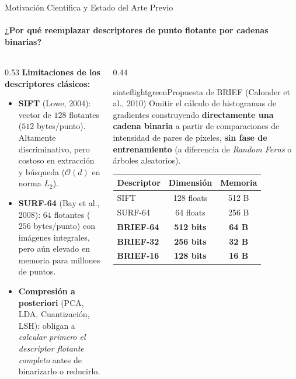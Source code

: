\documentclass{beamer}
\begin{document}
\begin{frame}{Motivación Científica y Estado del Arte Previo}
\framesubtitle{¿Por qué reemplazar descriptores de punto flotante por cadenas binarias?}
\begin{columns}[T]
\begin{column}{0.53\textwidth}
\scriptsize
\textbf{Limitaciones de los descriptores clásicos:}
\begin{itemize}\setlength{\itemsep}{4pt}
    \item \textbf{SIFT} (Lowe, 2004): vector de $128$ flotantes ($512$ bytes/punto). Altamente discriminativo, pero costoso en extracción y búsqueda ($\mathcal{O}(d)$ en norma $L_2$).
    \item \textbf{SURF-64} (Bay et al., 2008): $64$ flotantes ($256$ bytes/punto) con imágenes integrales, pero aún elevado en memoria para millones de puntos.
    \item \textbf{Compresión a posteriori} (PCA, LDA, Cuantización, LSH): obligan a \emph{calcular primero el descriptor flotante completo} antes de binarizarlo o reducirlo.
\end{itemize}
\end{column}
\begin{column}{0.44\textwidth}
\begin{colorblock}[black]{sinteflightgreen}{Propuesta de BRIEF (Calonder et al., 2010)}
\scriptsize
Omitir el cálculo de histogramas de gradientes construyendo \textbf{directamente una cadena binaria} a partir de comparaciones de intensidad de pares de píxeles, \textbf{sin fase de entrenamiento} (a diferencia de \emph{Random Ferns} o árboles aleatorios).
\end{colorblock}
\vspace{0.1cm}
\centering
\scriptsize
\begin{tabular}{lcc}
\toprule
\textbf{Descriptor} & \textbf{Dimensión} & \textbf{Memoria} \\
\midrule
SIFT & 128 floats & 512 B \\
SURF-64 & 64 floats & 256 B \\
\textbf{BRIEF-64} & \textbf{512 bits} & \textbf{64 B} \\
\textbf{BRIEF-32} & \textbf{256 bits} & \textbf{32 B} \\
\textbf{BRIEF-16} & \textbf{128 bits} & \textbf{16 B} \\
\bottomrule
\end{tabular}
\end{column}
\end{columns}
\end{frame}
\end{document}
